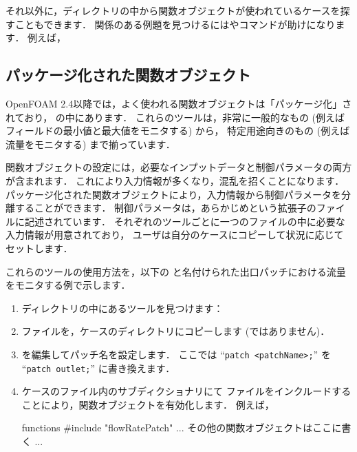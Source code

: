 それ以外に，ディレクトリの中から関数オブジェクトが使われているケースを探すこともできます．
関係のある例題を見つけるにはやコマンドが助けになります．
例えば，


\subsection{パッケージ化された関数オブジェクト}
\label{ssec:6.2.2@3.0.1}
OpenFOAM 2.4以降では，よく使われる関数オブジェクトは「パッケージ化」されており，
の中にあります．
これらのツールは，非常に一般的なもの (例えばフィールドの最小値と最大値をモニタする) から，
特定用途向きのもの (例えば流量をモニタする) まで揃っています．

関数オブジェクトの設定には，必要なインプットデータと制御パラメータの両方が含まれます．
これにより入力情報が多くなり，混乱を招くことになります．
パッケージ化された関数オブジェクトにより，入力情報から制御パラメータを分離することができます．
制御パラメータは，あらかじめという拡張子のファイルに記述されています．
それぞれのツールごとに一つのファイルの中に必要な入力情報が用意されており，
ユーザは自分のケースにコピーして状況に応じてセットします．

これらのツールの使用方法を，以下の
と名付けられた出口パッチにおける流量をモニタする例で示します．
\begin{enumerate}
 \item {}ディレクトリの中にあるツールを見つけます：\par
 \item {}ファイルを，ケースのディレクトリにコピーします
       (ではありません)．
 \item {}を編集してパッチ名を設定します．
       ここでは ``\verb|patch <patchName>;|'' を ``\verb|patch outlet;|'' に書き換えます．
 \item ケースのファイル内のサブディクショナリにて
       ファイルをインクルードすることにより，関数オブジェクトを有効化します．
       例えば，
\begin{OFverbatim}[file]
functions
{
    #include "flowRatePatch"
    ... その他の関数オブジェクトはここに書く ...
}
\end{OFverbatim}
\end{enumerate}

